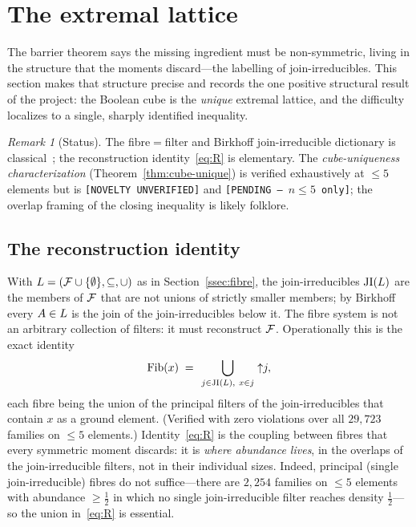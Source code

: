 \documentclass[11pt]{amsart}
\theoremstyle{definition}
\theoremstyle{remark}
\newtheorem{remark}[theorem]{Remark}
\begin{document}
\section{The extremal lattice}
\label{sec:extremal}

The barrier theorem says the missing ingredient must be non-symmetric, living in
the structure that the moments discard---the labelling of join-irreducibles. This
section makes that structure precise and records the one positive structural
result of the project: the Boolean cube is the \emph{unique} extremal lattice, and
the difficulty localizes to a single, sharply identified inequality.

\begin{remark}[Status]\label{rmk:extremal-status}
The fibre$=$filter and Birkhoff join-irreducible dictionary is
classical~\cite{birkhoff1937,poonen1992}; the reconstruction identity~\eqref{eq:R}
is elementary. The \emph{cube-uniqueness characterization}
(Theorem~\ref{thm:cube-unique}) is verified exhaustively at $\le 5$ elements but
is \texttt{[NOVELTY UNVERIFIED]} and \texttt{[PENDING --- $n\le 5$ only]}; the
overlap framing of the closing inequality is likely folklore.
\end{remark}

\subsection{The reconstruction identity}\label{ssec:reconstruction}
With $L=(\mathcal{F}\cup\{\emptyset\},\subseteq,\cup)$ as in
Section~\ref{ssec:fibre}, the join-irreducibles $\mathrm{JI}(L)$ are the members of
$\mathcal{F}$ that are not unions of strictly smaller members; by Birkhoff every
$A\in L$ is the join of the join-irreducibles below it. The fibre system is not
an arbitrary collection of filters: it must reconstruct $\mathcal{F}$. Operationally this
is the exact identity
\begin{equation}\label{eq:R}
   \mathrm{Fib}(x)\;=\;\bigcup_{\,j\in\mathrm{JI}(L),\ x\in j\,}{\uparrow}j ,
\end{equation}
each fibre being the union of the principal filters of the join-irreducibles that
contain $x$ as a ground element. (Verified with zero violations over all
$29{,}723$ families on $\le 5$ elements.) Identity~\eqref{eq:R} is the coupling
between fibres that every symmetric moment discards: it is \emph{where abundance
lives}, in the overlaps of the join-irreducible filters, not in their individual
sizes. Indeed, principal (single join-irreducible) fibres do not suffice---there
are $2{,}254$ families on $\le 5$ elements with abundance $\ge\tfrac12$ in which no
single join-irreducible filter reaches density $\tfrac12$---so the union
in~\eqref{eq:R} is essential.
\end{document}
